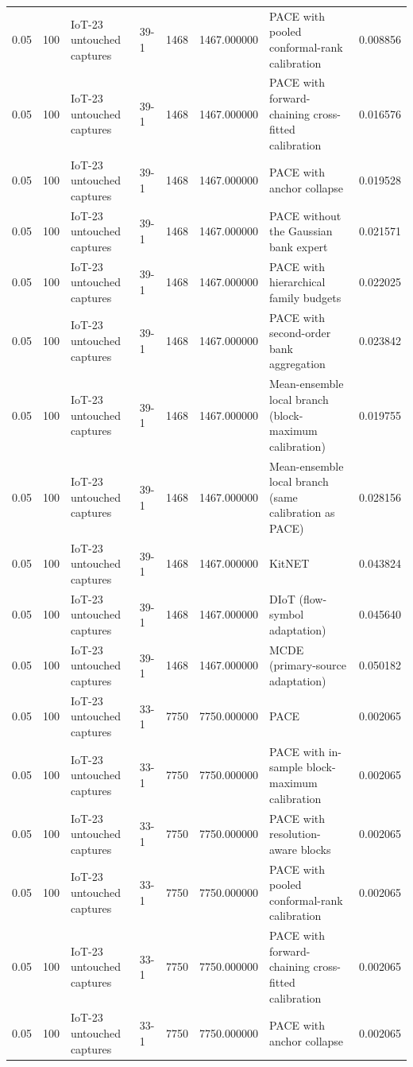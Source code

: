 \begin{tabular}{llllllll}
0.05 & 100 & IoT-23 untouched captures & 39-1 & 1468 & 1467.000000 & PACE with pooled conformal-rank calibration & 0.008856 \\
0.05 & 100 & IoT-23 untouched captures & 39-1 & 1468 & 1467.000000 & PACE with forward-chaining cross-fitted calibration & 0.016576 \\
0.05 & 100 & IoT-23 untouched captures & 39-1 & 1468 & 1467.000000 & PACE with anchor collapse & 0.019528 \\
0.05 & 100 & IoT-23 untouched captures & 39-1 & 1468 & 1467.000000 & PACE without the Gaussian bank expert & 0.021571 \\
0.05 & 100 & IoT-23 untouched captures & 39-1 & 1468 & 1467.000000 & PACE with hierarchical family budgets & 0.022025 \\
0.05 & 100 & IoT-23 untouched captures & 39-1 & 1468 & 1467.000000 & PACE with second-order bank aggregation & 0.023842 \\
0.05 & 100 & IoT-23 untouched captures & 39-1 & 1468 & 1467.000000 & Mean-ensemble local branch (block-maximum calibration) & 0.019755 \\
0.05 & 100 & IoT-23 untouched captures & 39-1 & 1468 & 1467.000000 & Mean-ensemble local branch (same calibration as PACE) & 0.028156 \\
0.05 & 100 & IoT-23 untouched captures & 39-1 & 1468 & 1467.000000 & KitNET & 0.043824 \\
0.05 & 100 & IoT-23 untouched captures & 39-1 & 1468 & 1467.000000 & DIoT (flow-symbol adaptation) & 0.045640 \\
0.05 & 100 & IoT-23 untouched captures & 39-1 & 1468 & 1467.000000 & MCDE (primary-source adaptation) & 0.050182 \\
0.05 & 100 & IoT-23 untouched captures & 33-1 & 7750 & 7750.000000 & PACE & 0.002065 \\
0.05 & 100 & IoT-23 untouched captures & 33-1 & 7750 & 7750.000000 & PACE with in-sample block-maximum calibration & 0.002065 \\
0.05 & 100 & IoT-23 untouched captures & 33-1 & 7750 & 7750.000000 & PACE with resolution-aware blocks & 0.002065 \\
0.05 & 100 & IoT-23 untouched captures & 33-1 & 7750 & 7750.000000 & PACE with pooled conformal-rank calibration & 0.002065 \\
0.05 & 100 & IoT-23 untouched captures & 33-1 & 7750 & 7750.000000 & PACE with forward-chaining cross-fitted calibration & 0.002065 \\
0.05 & 100 & IoT-23 untouched captures & 33-1 & 7750 & 7750.000000 & PACE with anchor collapse & 0.002065 \\

\end{tabular}
